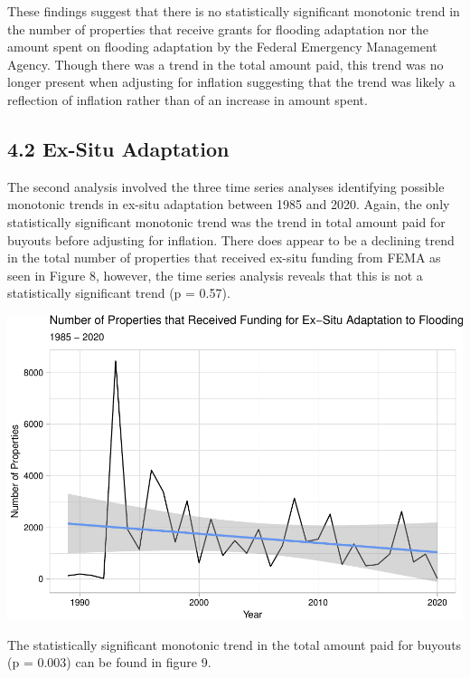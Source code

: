 \documentclass[
  12pt,
]{article}
\begin{document}
These findings suggest that there is no statistically significant
monotonic trend in the number of properties that receive grants for
flooding adaptation nor the amount spent on flooding adaptation by the
Federal Emergency Management Agency. Though there was a trend in the
total amount paid, this trend was no longer present when adjusting for
inflation suggesting that the trend was likely a reflection of inflation
rather than of an increase in amount spent.

\hypertarget{ex-situ-adaptation}{%
\subsection{4.2 Ex-Situ Adaptation}\label{ex-situ-adaptation}}

The second analysis involved the three time series analyses identifying
possible monotonic trends in ex-situ adaptation between 1985 and 2020.
Again, the only statistically significant monotonic trend was the trend
in total amount paid for buyouts before adjusting for inflation. There
does appear to be a declining trend in the total number of properties
that received ex-situ funding from FEMA as seen in Figure 8, however,
the time series analysis reveals that this is not a statistically
significant trend (p = 0.57).

\includegraphics{finalreport_files/figure-latex/unnamed-chunk-15-1.pdf}
\newpage

The statistically significant monotonic trend in the total amount paid
for buyouts (p = 0.003) can be found in figure 9.
\end{document}
